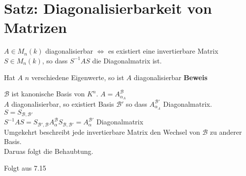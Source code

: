 \section{Satz: Diagonalisierbarkeit von Matrizen}
		\item $A\in M_n(k)$ diagonalisierbar $\Leftrightarrow$ es existiert eine invertierbare Matrix $S\in M_n(k)$, so dass $S^{-1}AS$ die Diagonalmatrix ist.
		\item Hat $A$ $n$ verschiedene Eigenwerte, so ist $A$ diagonalisierbar
	\subExEnd
	\textbf{Beweis}
		\item $\mathcal{B}$ ist kanonische Basis von $K^n$. $A=A_{\alpha_A}^{\mathcal{B}}$\\
			$A$ diagonalisierbar, so existiert Basis $\mathcal{B}'$ so dass $A_{\alpha_A}^{\mathcal{B}'}$ Diagonalmatrix.\\
			$S=S_{\mathcal{B},\mathcal{B}'}$\\
			$S^{-1}AS=S_{\mathcal{B}',\mathcal{B}}A_\alpha^\mathcal{B}S_{\mathcal{B},\mathcal{B'}}=A_\alpha^{\mathcal{B}'}$ Diagonalmatrix\\
			Umgekehrt beschreibt jede invertierbare Matrix den Wechsel von $\mathcal{B}$ zu anderer Basis.\\
			Daruas folgt die Behaubtung.
		\item Folgt aus 7.15
	\subExEnd
